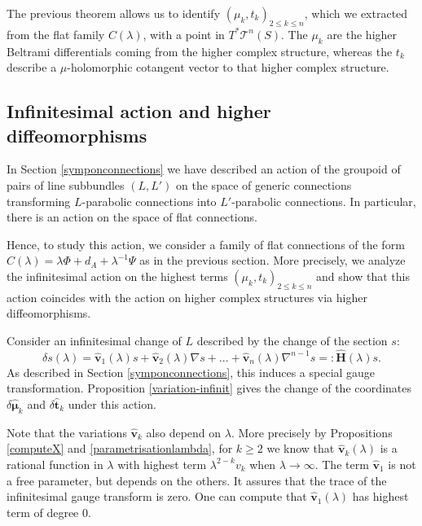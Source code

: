 \documentclass[11pt]{amsart}
\numberwithin{thm}{section} %
\numberwithin{equation}{section} %
\numberwithin{figure}{section} %
\renewcommand*{\l}{\lambda}
\newcommand*{\mc}{\mathcal}
\newcommand*{\cotang}{T^*\mc{T}^n(S)}
\begin{document}
The previous theorem allows us to identify $(\mu_k, t_k)_{2\leq k\leq n}$, which we extracted from the flat family $C(\l)$, with a point in $\cotang$. The $\mu_k$ are the higher Beltrami differentials coming from the higher complex structure, whereas the $t_k$ describe a $\mu$-holomorphic cotangent vector to that higher complex structure. 



\subsection{Infinitesimal action and higher diffeomorphisms}\label{inf-action-2}

In Section \ref{symponconnections} we have described an action of the groupoid of pairs of line subbundles $(L,L')$ on the space of generic connections transforming $L$-parabolic connections into $L'$-parabolic connections. In particular, there is an action on the space of flat connections. 

Hence, to study this action, we consider a family of flat connections of the form $C(\l)=\l\Phi+d_A+\l^{-1}\Psi$ as in the previous section.
More precisely, we analyze the infinitesimal action on the highest terms $(\mu_k,t_k)_{2\leq k\leq n}$ and show that this action coincides with the action on higher complex structures via higher diffeomorphisms. 

\medskip
Consider an infinitesimal change of $L$ described by the change of the section $s$: 
\begin{equation}\label{Eq:action-with-param}
\delta s(\l) = \bm\hat{v}_1(\l)s+\bm\hat{v}_2(\l)\nabla s+...+\bm\hat{v}_{n}(\l)\nabla^{n-1}s=:\bm\hat{H}(\l)s.
\end{equation} 
As described in Section \ref{symponconnections}, this induces a special gauge transformation. Proposition \ref{variation-infinit} gives the change of the coordinates $\delta \bm\hat{\mu}_k$ and $\delta\bm\hat{t}_k$ under this action. 

Note that the variations $\bm\hat{v}_k$ also depend on $\l$. More precisely by Propositions \ref{computeX} and \ref{parametrisationlambda}, for $k\geq 2$ we know that $\bm\hat{v}_k(\l)$  is a rational function in $\l$ with highest term $\l^{2-k}v_k$ when $\l \rightarrow \infty$. 
The term $\bm\hat{v}_1$ is not a free parameter, but depends on the others. It assures that the trace of the infinitesimal gauge transform is zero. One can compute that $\bm\hat{v}_1(\l)$ has highest term of degree 0.
\end{document}
